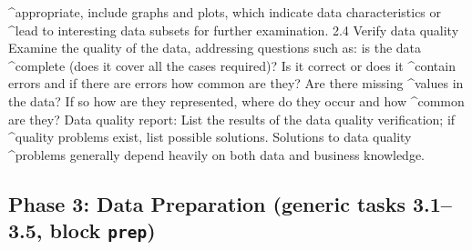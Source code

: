 \begin{AppCPrompt}
\AppCCont@^appropriate, include graphs and plots, which indicate data characteristics or
\AppCCont@^lead to interesting data subsets for further examination.
2.4 Verify data quality
Examine the quality of the data, addressing questions such as: is the data
\AppCCont@^complete (does it cover all the cases required)? Is it correct or does it
\AppCCont@^contain errors and if there are errors how common are they? Are there missing
\AppCCont@^values in the data? If so how are they represented, where do they occur and how
\AppCCont@^common are they?
Data quality report: List the results of the data quality verification; if
\AppCCont@^quality problems exist, list possible solutions. Solutions to data quality
\AppCCont@^problems generally depend heavily on both data and business knowledge.
\end{AppCPrompt}
\subsection*{Phase 3: Data Preparation (generic tasks 3.1--3.5, block \texttt{prep})}
